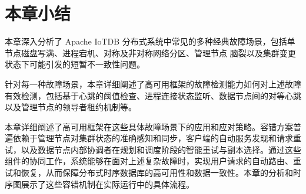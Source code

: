 \section{本章小结}

本章深入分析了 Apache IoTDB 分布式系统中常见的多种经典故障场景，包括单节点磁盘写满、进程宕机、对称及非对称网络分区、管理节点 脑裂以及集群变更状态下可能引发的短暂不一致性问题。

针对每一种故障场景，本章详细阐述了高可用框架的故障检测能力如何对上述故障有效检测，包括基于心跳的阈值检查、进程连接状态监听、数据节点间的对等心跳以及管理节点的领导者租约机制等。

本章详细阐述了高可用框架在这些具体故障场景下的应用和应对策略。容错方案普遍依赖于管理节点对集群状态的准确感知和同步，客户端的自动服务发现和请求重试，以及数据节点内部协调者在规划和调度阶段的智能重试与副本选择。通过这些组件的协同工作，系统能够在面对上述复杂故障时，实现用户请求的自动路由、重试和恢复，从而保障分布式时序数据库的高可用性和数据一致性。本章的分析和时序图展示了这些容错机制在实际运行中的具体流程。